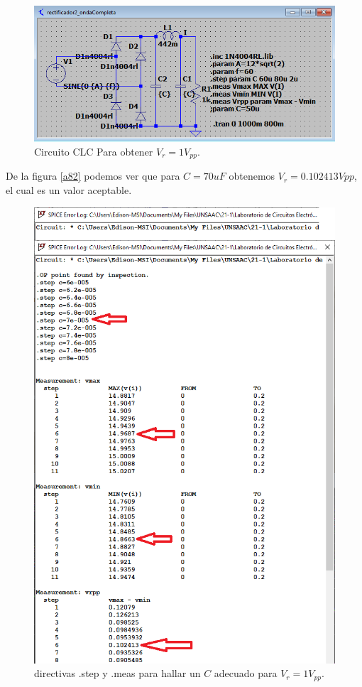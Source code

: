 \documentclass[a4paper]{IEEEtran} %
\begin{document}
\begin{figure}[!h]
	\centering
	\includegraphics[scale=0.5]{IMAGENES/a81}
	\caption{Circuito CLC Para obtener $V_r = 1V_{pp}$.}
	\label{a81}
\end{figure}

De la figura \eqref{a82} podemos ver que para $C= 70uF$ obtenemos $V_r = 0.102413 V{pp}$, el cual es un valor aceptable.

\begin{figure}[!h]
	\centering
	\includegraphics[scale=0.5]{IMAGENES/a82}
	\caption{directivas .step y .meas para hallar un $C$ adecuado para $V_r = 1V_{pp}$.}
	\label{a82}
\end{figure}
\end{document}
